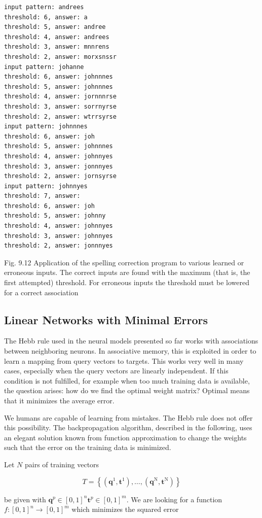 \documentclass[10pt]{article}
\begin{document}
\begin{verbatim}
input pattern: andrees
threshold: 6, answer: a
threshold: 5, answer: andree
threshold: 4, answer: andrees
threshold: 3, answer: mnnrens
threshold: 2, answer: morxsnssr
input pattern: johanne
threshold: 6, answer: johnnnes
threshold: 5, answer: johnnnes
threshold: 4, answer: jornnnrse
threshold: 3, answer: sorrnyrse
threshold: 2, answer: wtrrsyrse
input pattern: johnnnes
threshold: 6, answer: joh
threshold: 5, answer: johnnnes
threshold: 4, answer: johnnyes
threshold: 3, answer: jonnnyes
threshold: 2, answer: jornsyrse
input pattern: johnnyes
threshold: 7, answer:
threshold: 6, answer: joh
threshold: 5, answer: johnny
threshold: 4, answer: johnnyes
threshold: 3, answer: johnnyes
threshold: 2, answer: jonnnyes
\end{verbatim}

Fig. 9.12 Application of the spelling correction program to various learned or erroneous inputs. The correct inputs are found with the maximum (that is, the first attempted) threshold. For erroneous inputs the threshold must be lowered for a correct association

\subsection*{Linear Networks with Minimal Errors}
The Hebb rule used in the neural models presented so far works with associations between neighboring neurons. In associative memory, this is exploited in order to learn a mapping from query vectors to targets. This works very well in many cases, especially when the query vectors are linearly independent. If this condition is not fulfilled, for example when too much training data is available, the question arises: how do we find the optimal weight matrix? Optimal means that it minimizes the average error.

We humans are capable of learning from mistakes. The Hebb rule does not offer this possibility. The backpropagation algorithm, described in the following, uses an elegant solution known from function approximation to change the weights such that the error on the training data is minimized.

Let $N$ pairs of training vectors

$$
T=\left\{\left(\boldsymbol{q}^{1}, \boldsymbol{t}^{1}\right), \ldots,\left(\boldsymbol{q}^{\mathrm{N}}, \boldsymbol{t}^{\mathrm{N}}\right)\right\}
$$

be given with $\boldsymbol{q}^{p} \in[0,1]^{n} \boldsymbol{t}^{p} \in[0,1]^{m}$. We are looking for a function $f:[0,1]^{n} \rightarrow [0,1]^{m}$ which minimizes the squared error
\end{document}
